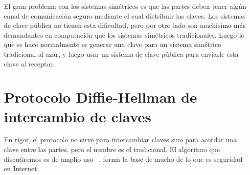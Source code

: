   El gran problema con los sistemas simétricos
  es que las partes deben tener algún canal de comunicación seguro
  mediante el cual distribuir las claves.%
  Los sistemas de clave pública no tienen esta dificultad,
  pero por otro lado son muchísimo más demandantes en computación
  que los sistemas simétricos tradicionales.
  Luego lo que se hace normalmente
  es generar una clave para un sistema simétrico tradicional
  al azar,
  y luego usar un sistema de clave pública
  para enviarle esta clave al receptor.%

\section{Protocolo Diffie-Hellman de intercambio de claves}
\label{sec:Diffie-Hellman}

  En rigor,
  el protocolo no sirve para intercambiar claves
  sino para acordar una clave entre las partes,
  pero el nombre es el tradicional.
  El algoritmo que discutiremos es de amplio uso~%
    \cite{carts01:_review_diffie_hellman},
  forma la base de mucho de lo que es seguridad en Internet.%


